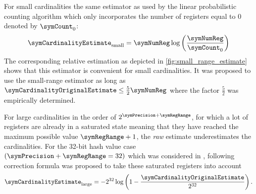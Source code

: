 \documentclass[a4paper]{scrartcl}
\begin{document}
For small cardinalities the same estimator as used by the linear probabilistic counting algorithm \cite{Whang1990} which only incorporates the number of registers equal to 0 denoted by $\symCount_0$:
\begin{equation}
\label{equ:small_range_estimate}
\symCardinalityEstimate_\text{small} = \symNumReg \log\left(
\frac{\symNumReg}{\symCount_0}
\right)
\end{equation}
The corresponding relative estimation as depicted in \autoref{fig:small_range_estimate} shows that this estimator is convenient for small cardinalities.
It was proposed to use the small-range estimator as long as $\symCardinalityOriginalEstimate \leq \frac{5}{2}\symNumReg$ where the factor $\frac{5}{2}$ was empirically determined. 

For large cardinalities in the order of $2^{\symPrecision+\symRegRange}$, for which a lot of registers are already in a saturated state meaning that they have reached the maximum possible value $\symRegRange + 1$, the \emph{raw} estimate underestimates the cardinalities. For the 32-bit hash value case $(\symPrecision+\symRegRange=32)$ which was considered in \cite{Flajolet2007}, following correction formula was proposed to take these saturated registers into account
\begin{equation}
\label{equ:large_range_estimate}
\symCardinalityEstimate_\text{large}
=
-2^{32}\log\left(1-\frac{\symCardinalityOriginalEstimate}{2^{32}}\right).
\end{equation}
\end{document}
